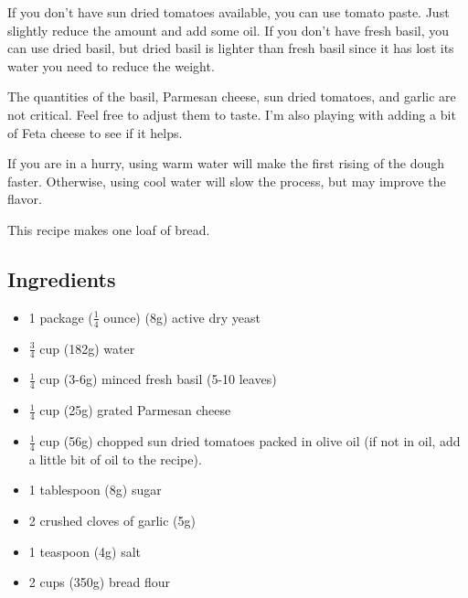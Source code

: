 \documentclass[10pt, openany]{book}
\begin{document}
If you don't have sun dried tomatoes available, you can use tomato paste.  Just slightly reduce the amount and add some oil.  If you don't have fresh basil, you can use dried basil, but dried basil is lighter than fresh basil since it has lost its water you need to reduce the weight.

The quantities of the basil, Parmesan cheese, sun dried tomatoes, and garlic are not critical.  Feel free to adjust them to taste.  I'm also playing with adding a bit of Feta cheese to see if it helps.

If you are in a hurry, using warm water will make the first rising of the dough faster.  Otherwise, using cool water will slow the process, but may improve the flavor.

This recipe makes one loaf of bread.

\subsection{Ingredients}
\begin{itemize}
  \item 1 package ($\frac{1}{4}$ ounce) (8g) active dry yeast
  \item $\frac{3}{4}$ cup (182g) water
  \item $\frac{1}{4}$ cup (3-6g) minced fresh basil (5-10 leaves)
  \item $\frac{1}{4}$ cup (25g) grated Parmesan cheese
  \item $\frac{1}{4}$ cup (56g) chopped sun dried tomatoes packed in olive oil (if not in oil, add a little bit of oil to the recipe).
  \item 1 tablespoon (8g) sugar
  \item 2 crushed cloves of garlic (5g)
  \item 1 teaspoon (4g) salt
  \item 2 cups (350g) bread flour
\end{itemize}
\end{document}
